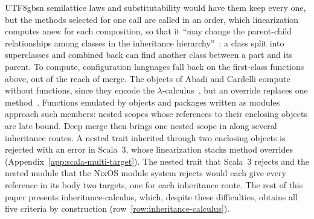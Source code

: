 \begin{CJK*}{UTF8}{gbsn}
semilattice laws and substitutability would have them keep every one, but the methods selected for one
call are called in an order, which linearization computes anew for each composition, so that it ``may
change the parent-child relationships among classes in the inheritance
hierarchy''~\cite{scharli2003-traits}: a class split into superclasses and combined back can find
another class between a part and its parent.
To compute, configuration languages fall back on the first-class functions above, out of the reach of merge.
The objects of Abadi and Cardelli compute without functions, since they encode the
$\lambda$-calculus~\cite[\S~2.2]{abadi1994-primitive-objects}, but an override replaces one
method~\cite{abadi1996-theory-of-objects}.
Functions emulated by objects and packages written as modules approach such members: nested scopes whose
references to their enclosing objects are late bound.
Deep merge then brings one nested scope in along several inheritance routes.
A nested trait inherited through two enclosing objects is rejected with an error in Scala~3, whose
linearization stacks method overrides~\cite[ch.~5, ``Traits'']{scala-contributors-scala3-specification}
(Appendix~\ref{app:scala-multi-target}).
The nested trait that Scala~3 rejects and the nested module that the NixOS module system rejects
would each give every reference in its body two targets, one for each inheritance route.
The rest of this paper presents inheritance-calculus, which, despite these difficulties, obtains all five
criteria by construction (row~\ref{row:inheritance-calculus}).
\fi

\section{}
\label{sec:syntax}

\subsection{}
\label{sec:ast}



\end{CJK*}
